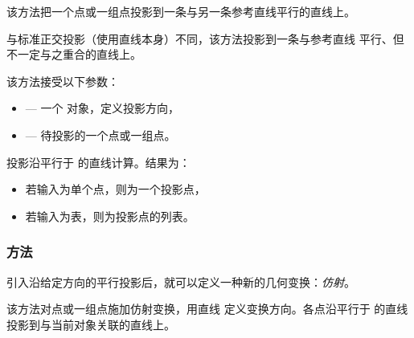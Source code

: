 该方法把一个点或一组点投影到一条与另一条参考直线平行的直线上。

\medskip

与标准正交投影（使用直线本身）不同，该方法投影到一条与参考直线  平行、但不一定与之重合的直线上。

\medskip

该方法接受以下参数：
\begin{itemize}
  \item {} — 一个  对象，定义投影方向，
  \item {} — 待投影的一个点或一组点。
\end{itemize}


投影沿平行于  的直线计算。结果为：
\begin{itemize}
  \item 若输入为单个点，则为一个投影点，
  \item 若输入为表，则为投影点的列表。
\end{itemize}

\vspace{1em}

\begin{tkzexample}[latex=.5\textwidth]
\begin{center}
\end{center}

\end{tkzexample}

\subsubsection{方法 }
\label{ssub:method_line_affinity}

引入沿给定方向的平行投影后，就可以定义一种新的几何变换：\emph{仿射}。

\medskip

该方法对点或一组点施加仿射变换，用直线  定义变换方向。各点沿平行于  的直线投影到与当前对象关联的直线上。

\medskip

